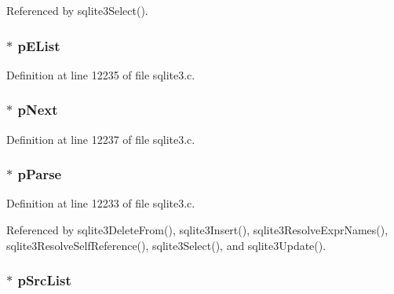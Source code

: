 Referenced by sqlite3\+Select().

\hypertarget{struct_name_context_a08025e7aa4f4c6b65204b463580746ef}{}
\subsubsection[{p\+E\+List}]{$\ast$ p\+E\+List}\label{struct_name_context_a08025e7aa4f4c6b65204b463580746ef}


Definition at line 12235 of file sqlite3.\+c.

\hypertarget{struct_name_context_a378641f900e09d4c613d35b2808d1b82}{}
\subsubsection[{p\+Next}]{$\ast$ p\+Next}\label{struct_name_context_a378641f900e09d4c613d35b2808d1b82}


Definition at line 12237 of file sqlite3.\+c.

\hypertarget{struct_name_context_ac700bf257b32cd7e491fde90a081379d}{}
\subsubsection[{p\+Parse}]{$\ast$ p\+Parse}\label{struct_name_context_ac700bf257b32cd7e491fde90a081379d}


Definition at line 12233 of file sqlite3.\+c.



Referenced by sqlite3\+Delete\+From(), sqlite3\+Insert(), sqlite3\+Resolve\+Expr\+Names(), sqlite3\+Resolve\+Self\+Reference(), sqlite3\+Select(), and sqlite3\+Update().

\hypertarget{struct_name_context_afbf9e5f3766df361d597cbcaba479e1d}{}
\subsubsection[{p\+Src\+List}]{$\ast$ p\+Src\+List}\label{struct_name_context_afbf9e5f3766df361d597cbcaba479e1d}


